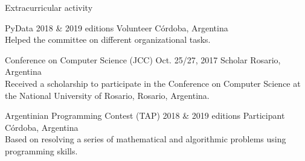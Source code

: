 \documentclass{curriculum}
\begin{document}
\begin{cvsection}{Extracurricular activity}

    \makesectionitemheader
        {PyData}                                            {2018 \& 2019 editions}
        {Volunteer}                                         {Córdoba, Argentina} \\
        \vspace{0.5ex}
        {Helped the committee on different organizational tasks.}

    \makesectionitemheader
        {Conference on Computer Science (JCC)}              {Oct. 25/27, 2017}
        {Scholar}                                           {Rosario, Argentina} \\
        \vspace{0.5ex}
        {
            Received a scholarship to participate in the Conference on
            Computer Science at the National University of Rosario, Rosario, Argentina.
        }

    \makesectionitemheader
        {Argentinian Programming Contest (TAP)}             {2018 \& 2019 editions}
        {Participant}                                       {Córdoba, Argentina} \\
        \vspace{0.5ex}
        {
            Based on resolving a series of mathematical and algorithmic
            problems using programming skills.
        }

\end{cvsection}

\end{document}
